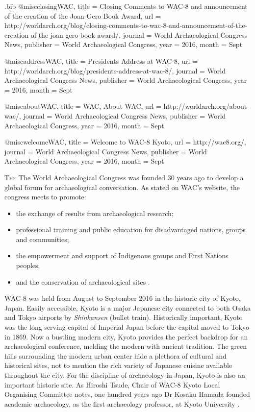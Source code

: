 \begin{filecontents}{\IJSRAidentifier.bib}
@misc{closingWAC,
	title = {Closing Comments to WAC-8 and announcement of the creation of the Joan Gero Book Award},
	url = {http://worldarch.org/blog/closing-comments-to-wac-8-and-announcement-of-the-creation-of-the-joan-gero-book-award/},
	journal = {World Archaeological Congress News},
	publisher = {World Archaeological Congress},
	year = {2016},
	month = {Sept}
}

@misc{addressWAC,
	title = {Presidents Address at WAC-8},
	url = {http://worldarch.org/blog/presidents-address-at-wac-8/},
	journal = {World Archaeological Congress News},
	publisher = {World Archaeological Congress},
	year = {2016},
	month = {Sept}
}

@misc{aboutWAC,
	title = {WAC, About WAC},
	url = {http://worldarch.org/about-wac/},
	journal = {World Archaeological Congress News},
	publisher = {World Archaeological Congress},
	year = {2016},
	month = {Sept}
}

@misc{welcomeWAC,
	title = {Welcome to WAC-8 Kyoto},
	url = {http://wac8.org/},
	journal = {World Archaeological Congress News},
	publisher = {World Archaeological Congress},
	year = {2016},
	month = {Sept}
}
\end{filecontents}

%
\IJSRAopening
\lettrine{T}{he} The World Archaeological Congress was founded 30 years ago to develop a global forum for archaeological conversation. As stated on WAC’s website, the congress meets to promote:
\begin{itemize}
	\item the exchange of results from archaeological research;
	\item professional training and public education for disadvantaged nations, groups and communities;
	\item the empowerment and support of Indigenous groups and First Nations peoples;
	\item and the conservation of archaeological sites \parencite{aboutWAC}.
\end{itemize}

WAC-8 was held from August  to September  2016 in the historic city of Kyoto, Japan. Easily accessible, Kyoto is a major Japanese city connected to both Osaka and Tokyo airports by \textit{Shinkansen} (bullet train). Historically important, Kyoto was the long serving capital of Imperial Japan before the capital moved to Tokyo in 1869. Now a bustling modern city, Kyoto provides the perfect backdrop for an archaeological conference, melding the modern with ancient tradition. The green hills surrounding the modern urban center hide a plethora of cultural and historical sites, not to mention the rich variety of Japanese cuisine available throughout the city. For the discipline of archaeology in Japan, Kyoto is also an important historic site. As Hiroshi Tsude, Chair of WAC-8 Kyoto Local Organising Committee notes, one hundred years ago Dr Kosaku Hamada founded academic archaeology, as the first archaeology professor, at Kyoto University \parencite{welcomeWAC}. 


